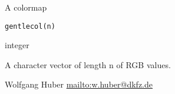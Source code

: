\begin{Description}\relax
A colormap
\end{Description}
\begin{Usage}
\begin{verbatim}gentlecol(n)\end{verbatim}
\end{Usage}
\begin{Arguments}
\begin{ldescription}
\item[\code{n}] integer
\end{ldescription}
\end{Arguments}
\begin{Value}
A character vector of length n of RGB values.
\end{Value}
\begin{Author}\relax
Wolfgang Huber \url{mailto:w.huber@dkfz.de}
\end{Author}

